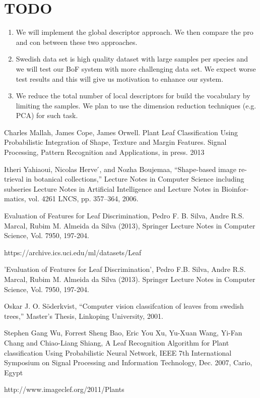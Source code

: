 \documentclass{article}
\begin{document}
\section{TODO}
\begin{enumerate}
  \item We will implement the global descriptor approach. We then compare the pro and con between these two approaches.
  \item Swedish data set is high quality dataset with large samples per species and we will test our BoF system with more challenging data set. We expect worse test results and this will give us motivation to enhance our system.
  \item We reduce the total number of local descriptors for build the vocabulary by limiting the samples. We plan to use the dimension reduction techniques (e.g. PCA) for such task.
\end{enumerate}

\begin{thebibliography}{9}
Charles Mallah, James Cope, James Orwell. Plant Leaf Classification Using Probabilistic Integration of Shape, Texture and Margin Features. Signal Processing, Pattern Recognition and Applications, in press. 2013

Itheri Yahiaoui, Nicolas Herve ́, and Nozha Boujemaa, “Shape-based image re- trieval in botanical collections,” Lecture Notes in Computer Science including subseries Lecture Notes in Artificial Intelligence and Lecture Notes in Bioinfor- matics, vol. 4261 LNCS, pp. 357–364, 2006.

Evaluation of Features for Leaf Discrimination, Pedro F. B. Silva, Andre R.S. Marcal, Rubim M. Almeida da Silva (2013), Springer Lecture Notes in Computer Science, Vol. 7950, 197-204.

https://archive.ics.uci.edu/ml/datasets/Leaf

'Evaluation of Features for Leaf Discrimination', Pedro F.B. Silva, Andre R.S. Marcal, Rubim M. Almeida da Silva (2013). Springer Lecture Notes in Computer Science, Vol. 7950, 197-204.

Oskar J. O. Söderkvist, “Computer vision classifcation of leaves from swedish trees,” Master’s Thesis, Linkoping University, 2001.

Stephen Gang Wu, Forrest Sheng Bao, Eric You Xu, Yu-Xuan Wang, Yi-Fan Chang and Chiao-Liang Shiang, A Leaf Recognition Algorithm for Plant classification Using Probabilistic Neural Network, IEEE 7th International Symposium on Signal Processing and Information Technology, Dec. 2007, Cario, Egypt

http://www.imageclef.org/2011/Plants

\end{thebibliography}
\end{document}
